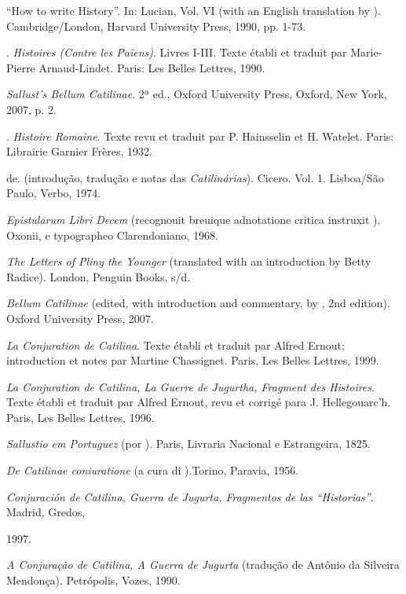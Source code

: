 \begin{bibliohedra}
 “How to write History”. In: Lucian, Vol. VI (with an English translation by ). Cambridge/London, Harvard University Press, 1990, pp. 1-73.

. \emph{Histoires (Contre les Païens)}. Livres I-III. Texte établi et traduit par Marie-Pierre Arnaud-Lindet. Paris: Les Belles Lettres, 1990. 

 \emph{Sallust’s Bellum Catilinae}. 2ª ed., Oxford University Press, Oxford, New York, 2007,   p. 2. 

.  \emph{Histoire Romaine}. Texte revu et traduit par P. Hainsselin et H. Watelet. Paris: Librairie Garnier Frères, 1932.  


 de. (introdução, tradução e notas das \emph{Catilinárias}). Cicero. Vol. 1. Lisboa/São Paulo, Verbo, 1974. 

 \emph{Epistularum Libri Decem} (recognouit breuique adnotatione critica instruxit ). Oxonii, e typographeo Clarendoniano, 1968. 

 \emph{The Letters of Pliny the Younger} (translated with an introduction by Betty Radice). London, Penguin Books, s/d.


 \emph{Bellum Catilinae} (edited, with introduction and commentary, by , 2nd edition). Oxford University Press, 2007.

 \emph{La Conjuration de Catilina}. Texte établi et traduit par Alfred Ernout; introduction et notes par Martine Chassignet. Paris, Les Belles Lettres, 1999.

 \emph{La Conjuration de Catilina, La Guerre de Jugurtha, Fragment des Histoires}. Texte établi et traduit par Alfred Ernout, revu et corrigé para J. Hellegouarc’h. Paris, Les Belles Lettres, 1996.

 \emph{Sallustio em Portuguez} (por ). Paris, Livraria Nacional e Estrangeira, 1825.

 \emph{De Catilinae coniuratione} (a cura di ).Torino, Paravia, 1956.


 \emph{Conjuración de Catilina, Guerra de Jugurta, Fragmentos de las “Historias”}. Madrid, Gredos,

1997.

 \emph{A Conjuração de Catilina, A Guerra de Jugurta} (tradução de Antônio da Silveira Mendonça). Petrópolis, Vozes, 1990.



\end{bibliohedra}
